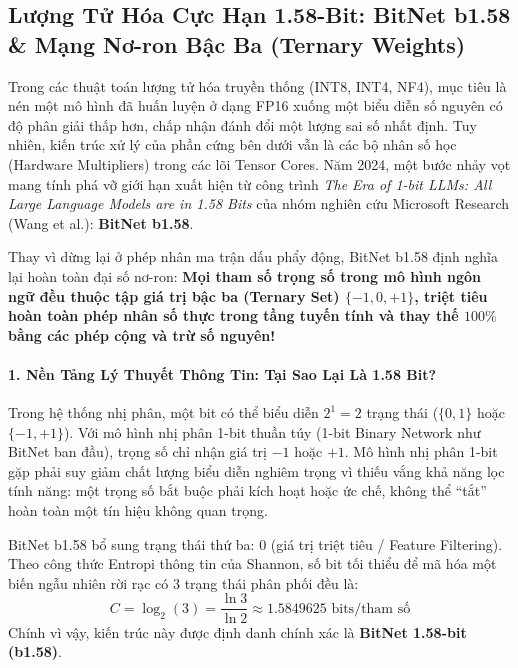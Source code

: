 \subsection{Lượng Tử Hóa Cực Hạn 1.58-Bit: BitNet b1.58 \& Mạng Nơ-ron Bậc Ba (Ternary Weights)}
\label{sec:bitnet-158b}

Trong các thuật toán lượng tử hóa truyền thống (INT8, INT4, NF4), mục tiêu là nén một mô hình đã huấn luyện ở dạng FP16 xuống một biểu diễn số nguyên có độ phân giải thấp hơn, chấp nhận đánh đổi một lượng sai số nhất định. Tuy nhiên, kiến trúc xử lý của phần cứng bên dưới vẫn là các bộ nhân số học (Hardware Multipliers) trong các lõi Tensor Cores. Năm 2024, một bước nhảy vọt mang tính phá vỡ giới hạn xuất hiện từ công trình \textit{The Era of 1-bit LLMs: All Large Language Models are in 1.58 Bits} của nhóm nghiên cứu Microsoft Research (Wang et al.): \textbf{BitNet b1.58}.

Thay vì dừng lại ở phép nhân ma trận dấu phẩy động, BitNet b1.58 định nghĩa lại hoàn toàn đại số nơ-ron: \textbf{Mọi tham số trọng số trong mô hình ngôn ngữ đều thuộc tập giá trị bậc ba (Ternary Set) $\{-1, 0, +1\}$, triệt tiêu hoàn toàn phép nhân số thực trong tầng tuyến tính và thay thế $100\%$ bằng các phép cộng và trừ số nguyên!}

\paragraph{1. Nền Tảng Lý Thuyết Thông Tin: Tại Sao Lại Là 1.58 Bit?}
Trong hệ thống nhị phân, một bit có thể biểu diễn $2^1 = 2$ trạng thái ($\{0, 1\}$ hoặc $\{-1, +1\}$). Với mô hình nhị phân 1-bit thuần túy (1-bit Binary Network như BitNet ban đầu), trọng số chỉ nhận giá trị $-1$ hoặc $+1$. Mô hình nhị phân 1-bit gặp phải suy giảm chất lượng biểu diễn nghiêm trọng vì thiếu vắng khả năng lọc tính năng: một trọng số bắt buộc phải kích hoạt hoặc ức chế, không thể ``tắt'' hoàn toàn một tín hiệu không quan trọng.

BitNet b1.58 bổ sung trạng thái thứ ba: $0$ (giá trị triệt tiêu / Feature Filtering). Theo công thức Entropi thông tin của Shannon, số bit tối thiểu để mã hóa một biến ngẫu nhiên rời rạc có 3 trạng thái phân phối đều là:
\begin{equation}
\label{eq:bitnet-shannon-capacity}
C = \log_2(3) = \frac{\ln 3}{\ln 2} \approx 1.5849625 \text{ bits/tham số}
\end{equation}
Chính vì vậy, kiến trúc này được định danh chính xác là \textbf{BitNet 1.58-bit (b1.58)}.

